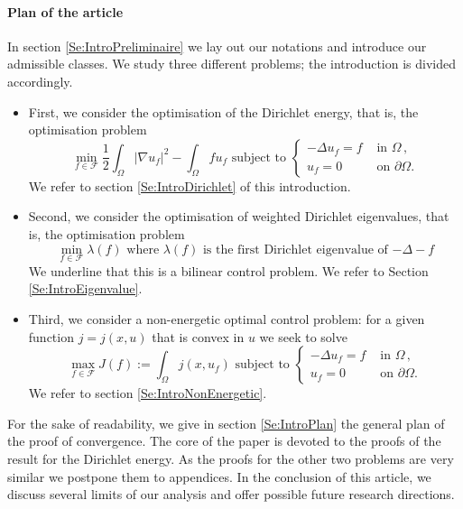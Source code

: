 \documentclass{article}
\def\O{{\Omega}}
\def\n{{\nabla}}
\numberwithin{equation}{section}
\begin{document}
\paragraph{Plan of the article }In section \ref{Se:IntroPreliminaire} we lay out our notations and introduce our admissible classes.
We study three different problems; the introduction is divided accordingly.
\begin{itemize}
\item First, we consider the optimisation of the Dirichlet energy, that is, the optimisation problem
\[ \min_{f\in \mathcal F}\frac12\int_\O |\n u_f|^2-\int_\O fu_f\text{ subject to }\begin{cases}-\Delta u_f=f&\text{ in }\O\,, 
\\ u_f=0&\text{ on }\partial \O.\end{cases}\] We refer to section \ref{Se:IntroDirichlet} of this introduction. 
\item Second, we consider the optimisation of weighted Dirichlet eigenvalues, that is, the optimisation problem
\[ \min_{f\in \mathcal F}\lambda(f)\text{ where $\lambda(f)$ is the first Dirichlet eigenvalue of $-\Delta -f$}\] We underline that this is a bilinear control problem. We refer to Section \ref{Se:IntroEigenvalue}.
\item Third, we consider a non-energetic optimal control problem: for a given function $j=j(x,u)$ that is convex in $u$ we seek to solve
\[\max_{f\in \mathcal F}J(f):=\int_\O j(x,u_f)  \text{ subject to }\begin{cases}-\Delta u_f=f&\text{ in }\O\,, 
\\ u_f=0&\text{ on }\partial \O.\end{cases}\] We refer to section \ref{Se:IntroNonEnergetic}.
\end{itemize}
For the sake of readability, we give in section \ref{Se:IntroPlan} the general plan of the proof of convergence. The core of the paper is devoted to the proofs of the result for the Dirichlet energy. As the proofs for the other two problems are very similar we postpone them to appendices.
In the conclusion of this article, we discuss several limits of our analysis and offer possible future research directions. 
 
\end{document}
